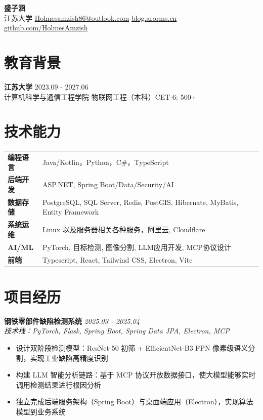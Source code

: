 \documentclass[11pt,a4paper]{article}
\newcommand{\resumeItem}[1]{\item\small{#1}}
\newcommand{\techstack}[1]{\textit{\small{\textcolor{secondary}{技术栈：#1}}}}
\newcommand{\projectdate}[1]{\hfill\textit{\small{\textcolor{secondary}{#1}}}}
\begin{document}
	
	\begin{center}
		{\large\bfseries\color{primary} 盛子涵}  \\[8pt]
		 江苏大学 \quad
		 \href{mailto:Holmesamzish86@outlook.com}{Holmesamzish86@outlook.com} \quad
		 \href{https://blog.arorms.cn}{blog.arorms.cn} \quad
		 \href{https://github.com/HolmesAmzish}{github.com/HolmesAmzish} \quad
	\end{center}
	
	
	\section{教育背景}
	\textbf{江苏大学} \hfill 2023.09 - 2027.06 \\
	计算机科学与通信工程学院 \quad 物联网工程（本科）\quad CET-6: 500+
	
	\section{技术能力}
	\begin{tabularx}{\textwidth}{@{}l X@{}}
		\textbf{编程语言} & Java/Kotlin，Python，C\#，TypeScript \\
		\textbf{后端开发} & ASP.NET, Spring Boot/Data/Security/AI \\
		\textbf{数据存储} & PostgreSQL, SQL Server, Redis, PostGIS, Hibernate, MyBatis, Entity Framework \\
		\textbf{系统运维} & Linux 以及服务器相关各种服务，阿里云, Cloudflare \\
		\textbf{AI/ML} & PyTorch, 目标检测, 图像分割, LLM应用开发, MCP协议设计 \\
		\textbf{前端} & Typescript, React, Tailwind CSS, Electron, Vite\\
	\end{tabularx}
	
	\section{项目经历}
	
	\textbf{钢铁零部件缺陷检测系统} \projectdate{2025.03 - 2025.04} \\
	\techstack{PyTorch, Flask, Spring Boot, Spring Data JPA, Electron, MCP}
	\begin{itemize}[leftmargin=15pt, itemsep=2pt, topsep=4pt]
		\resumeItem{设计双阶段检测模型：ResNet-50 初筛 + EfficientNet-B3 FPN 像素级语义分割，实现工业缺陷高精度识别}
		\resumeItem{构建 LLM 智能分析链路：基于 MCP 协议开放数据接口，使大模型能够实时调用检测结果进行根因分析}
		\resumeItem{独立完成后端服务架构（Spring Boot）与桌面端应用（Electron），实现算法模型到业务系统}
	\end{itemize}
	
\end{document}
